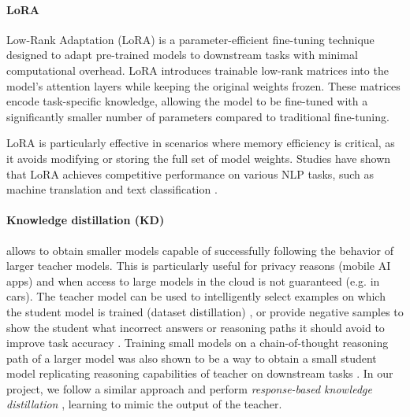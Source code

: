 \documentclass{article}
\begin{document}
\paragraph{LoRA}
Low-Rank Adaptation (LoRA) \cite{hu2021lora} is a parameter-efficient fine-tuning technique designed to adapt pre-trained models to downstream tasks with minimal computational overhead. LoRA introduces trainable low-rank matrices into the model's attention layers while keeping the original weights frozen. These matrices encode task-specific knowledge, allowing the model to be fine-tuned with a significantly smaller number of parameters compared to traditional fine-tuning.

LoRA is particularly effective in scenarios where memory efficiency is critical, as it avoids modifying or storing the full set of model weights. Studies have shown that LoRA achieves competitive performance on various NLP tasks, such as machine translation and text classification \cite{mao2025survey}.

\paragraph{Knowledge distillation (KD)} allows to obtain smaller models capable of successfully following the behavior of larger teacher models. This is particularly useful for privacy reasons (mobile AI apps) and when access to large models in the cloud is not guaranteed (e.g. in cars). The teacher model can be used to intelligently select examples on which the student model is trained (dataset distillation) \cite{yu2023dataset}, or provide negative samples to show the student what incorrect answers or reasoning paths it should avoid to improve task accuracy \cite{li2024turning}.
Training small models on a chain-of-thought reasoning path of a larger model was also shown to be a way to obtain a small student model replicating reasoning capabilities of teacher on downstream tasks \cite{magister2022teaching}. 
In our project, we follow a similar approach and perform \textit{response-based knowledge distillation} \cite{gou2021knowledge}, learning to mimic the output of the teacher.
\end{document}
